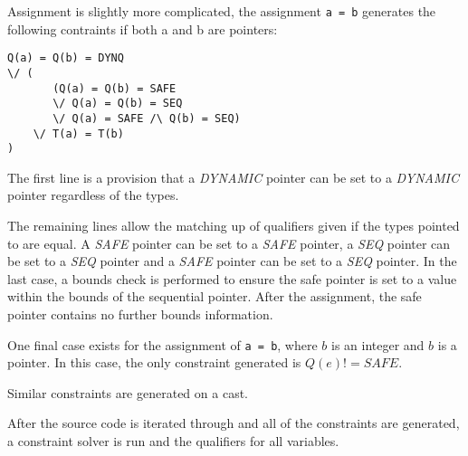 Assignment is slightly more complicated, the assignment \verb|a = b| generates the following contraints if both a and b are pointers:

\begin{verbatim}
Q(a) = Q(b) = DYNQ 
\/ (
       (Q(a) = Q(b) = SAFE 
       \/ Q(a) = Q(b) = SEQ
       \/ Q(a) = SAFE /\ Q(b) = SEQ) 
    \/ T(a) = T(b)
)
\end{verbatim}

The first line is a provision that a \textit{DYNAMIC} pointer can be set to a \textit{DYNAMIC} pointer regardless of the types.

The remaining lines allow the matching up of qualifiers given if the types pointed to are equal.
A \textit{SAFE} pointer can be set to a \textit{SAFE} pointer, a \textit{SEQ} pointer can be set to a \textit{SEQ} pointer and a \textit{SAFE} pointer can be set to a \textit{SEQ} pointer.
In the last case, a bounds check is performed to ensure the safe pointer is set to a value within the bounds of the sequential pointer.
After the assignment, the safe pointer contains no further bounds information.

One final case exists for the assignment of \verb|a = b|, where $b$ is an integer and $b$ is a pointer.
In this case, the only constraint generated is $Q(e) != SAFE$.

Similar constraints are generated on a cast.

After the source code is iterated through and all of the constraints are generated, a constraint solver is run and the qualifiers for all variables.


